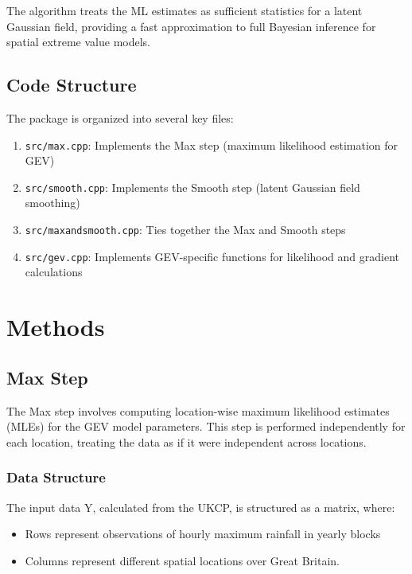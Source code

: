 \documentclass[
  letterpaper,
  DIV=11,
  numbers=noendperiod]{scrartcl}
\providecommand{\tightlist}{%
  \setlength{\itemsep}{0pt}\setlength{\parskip}{0pt}}\usepackage{longtable,booktabs,array}
\begin{document}
The algorithm treats the ML estimates as sufficient statistics for a
latent Gaussian field, providing a fast approximation to full Bayesian
inference for spatial extreme value models.

\subsection{Code Structure}\label{code-structure}

The package is organized into several key files:

\begin{enumerate}
\def\labelenumi{\arabic{enumi}.}
\tightlist
\item
  \texttt{src/max.cpp}: Implements the Max step (maximum likelihood
  estimation for GEV)
\item
  \texttt{src/smooth.cpp}: Implements the Smooth step (latent Gaussian
  field smoothing)
\item
  \texttt{src/maxandsmooth.cpp}: Ties together the Max and Smooth steps
\item
  \texttt{src/gev.cpp}: Implements GEV-specific functions for likelihood
  and gradient calculations
\end{enumerate}

\section{Methods}\label{methods}

\subsection{Max Step}\label{max-step}

The Max step involves computing location-wise maximum likelihood
estimates (MLEs) for the GEV model parameters. This step is performed
independently for each location, treating the data as if it were
independent across locations.

\subsubsection{Data Structure}\label{data-structure}

The input data Y, calculated from the UKCP, is structured as a matrix,
where:

\begin{itemize}
\tightlist
\item
  Rows represent observations of hourly maximum rainfall in yearly
  blocks
\item
  Columns represent different spatial locations over Great Britain.
\end{itemize}
\end{document}
